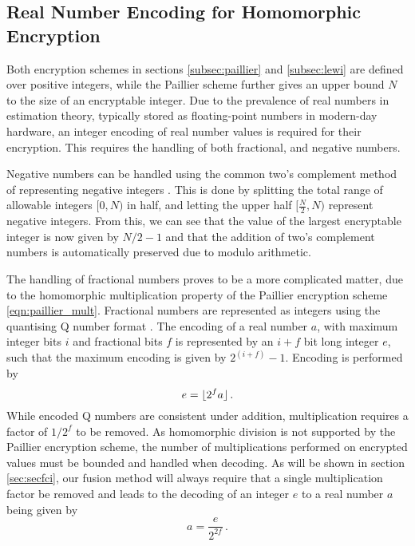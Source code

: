 \documentclass[letterpaper, 10 pt, conference]{ieeeconf}  %
\begin{document}
\subsection{Real Number Encoding for Homomorphic Encryption}
Both encryption schemes in sections \ref{subsec:paillier} and \ref{subsec:lewi} are defined over positive integers, while the Paillier scheme further gives an upper bound $N$ to the size of an encryptable integer. Due to the prevalence of real numbers in estimation theory, typically stored as floating-point numbers in modern-day hardware, an integer encoding of real number values is required for their encryption. This requires the handling of both fractional, and negative numbers. 

Negative numbers can be handled using the common two's complement method of representing negative integers \cite{liljaDesigningDigitalComputer}. This is done by splitting the total range of allowable integers $[0, N)$ in half, and letting the upper half $[\frac{N}{2}, N)$ represent negative integers. From this, we can see that the value of the largest encryptable integer is now given by $N/2-1$ and that the addition of two's complement numbers is automatically preserved due to modulo arithmetic.
   
The handling of fractional numbers proves to be a more complicated matter, due to the homomorphic multiplication property of the Paillier encryption scheme \eqref{eqn:paillier_mult}. Fractional numbers are represented as integers using the quantising Q number format \cite{oberstarFixedPointRepresentationFractional}. The encoding of a real number $a$, with maximum integer bits $i$ and fractional bits $f$ is represented by an $i+f$ bit long integer $e$, such that the maximum encoding is given by $2^{(i+f)}-1$. Encoding is performed by
\begin{equation}
   e = \lfloor{2^f a}\rfloor\,. \label{eqn:qmn}
\end{equation}
While encoded Q numbers are consistent under addition, multiplication requires a factor of $1/2^f$ to be removed. As homomorphic division is not supported by the Paillier encryption scheme, the number of multiplications performed on encrypted values must be bounded and handled when decoding. As will be shown in section \ref{sec:secfci}, our fusion method will always require that a single multiplication factor be removed and leads to the decoding of an integer $e$ to a real number $a$ being given by
\begin{equation}
   a = \frac{e}{2^{2f}}\,. \label{eqn:qmn_mult_decode}
\end{equation}
\end{document}
